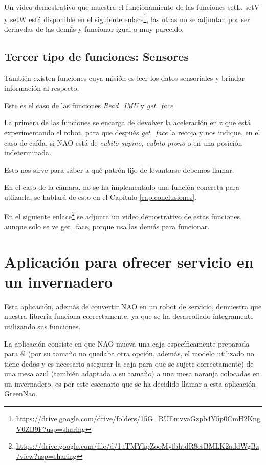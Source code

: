 Un video demostrativo que muestra el funcionamiento de las funciones setL, setV y setW está disponible en el siguiente enlace\footnote{\url{https://drive.google.com/drive/folders/15G_RUEmvvaGzpb4Y5p0CmH2KngV0ZB9F?usp=sharing}}, las otras no se adjuntan por ser deriavdas de las demás y funcionar igual o muy parecido.

\subsection{Tercer tipo de funciones: Sensores} \label{subsec:sensores}

También existen funciones cuya misión es leer los datos sensoriales y brindar información al respecto.

Este es el caso de las funciones \textit{Read\_IMU} y \textit{get\_face}.

La primera de las funciones se encarga de devolver la aceleración en z que está experimentando el robot, para que después \textit{get\_face} la recoja y nos indique, en el caso de caída, si NAO está de \textit{cubito supino, cubito prono} o en una posición indeterminada.

Esto nos sirve para saber a qué patrón fijo de levantarse debemos llamar.

En el caso de la cámara, no se ha implementado una función concreta para utlizarla, se hablará de esto en el Capítulo \ref{cap:conclusiones}. 

En el siguiente enlace\footnote{\url{https://drive.google.com/file/d/1uTMYkpZooMyfbhtdR8esBMLK2addWgBz/view?usp=sharing}} se adjunta un video demostrativo de estas funciones, aunque solo se ve get\_face, porque usa las demás para funcionar.

\section{Aplicación para ofrecer servicio en un invernadero} \label{sec:aplicacion}

Esta aplicación, además de convertir NAO en un robot de servicio, demuestra que nuestra librería funciona correctamente, ya que se ha desarrollado íntegramente utilizando sus funciones.

La aplicación consiste en que NAO mueva una caja específicamente preparada para él (por su tamaño no quedaba otra opción, además, el modelo utilizado no tiene dedos y es necesario asegurar la caja para que se sujete correctamente) de una mesa azul (también adaptada a su tamaño) a una mesa naranja colocadas en un invernadero, es por este escenario que se ha decidido llamar a esta aplicación GreenNao.

